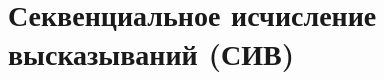 \documentclass[main]{subfiles}
\begin{document}
\chapter[СИВ]{Секвенциальное исчисление высказываний (СИВ)}
\end{document}
